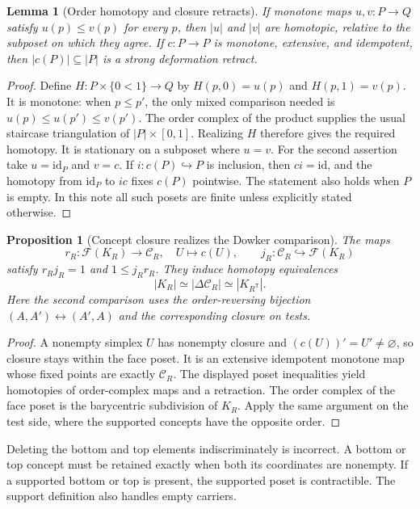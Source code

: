 \documentclass[11pt]{article}
\newtheorem{proposition}[theorem]{Proposition}
\newtheorem{lemma}[theorem]{Lemma}
\theoremstyle{remark}
\begin{document}
\begin{lemma}[Order homotopy and closure retracts]\label{cg:order-homotopy}
If monotone maps $u,v:P\to Q$ satisfy $u(p)\leq v(p)$ for every $p$, then
$|u|$ and $|v|$ are homotopic, relative to the subposet on which they agree.
If $c:P\to P$ is monotone, extensive, and idempotent, then
$|c(P)|\subseteq|P|$ is a strong deformation retract.
\end{lemma}
\begin{proof}
Define $H:P\times\{0<1\}\to Q$ by $H(p,0)=u(p)$ and $H(p,1)=v(p)$.
It is monotone: when $p\leq p'$, the only mixed comparison needed is
$u(p)\leq u(p')\leq v(p')$.
The order complex of the product supplies the usual staircase triangulation
of $|P|\times[0,1]$. Realizing $H$ therefore gives the required homotopy.
It is stationary on a subposet where $u=v$. For the second assertion take
$u=\mathrm{id}_P$ and $v=c$. If $i:c(P)\hookrightarrow P$ is inclusion,
then $c i=\mathrm{id}$, and the homotopy from $\mathrm{id}_P$ to $i c$
fixes $c(P)$ pointwise. The statement also holds when $P$ is empty. In this note all such posets are finite unless explicitly stated otherwise.
\end{proof}

\begin{proposition}[Concept closure realizes the Dowker comparison]
\label{nb:dowker-core}
The maps
\[
 r_R:\mathcal F(K_R)\longrightarrow\mathcal C_R,
 \quad U\longmapsto c(U),
 \qquad j_R:\mathcal C_R\hookrightarrow\mathcal F(K_R)
\]
satisfy $r_Rj_R=1$ and $1\leq j_Rr_R$. They induce homotopy
equivalences
\[
 |K_R|\simeq|\Delta\mathcal C_R|\simeq|K_{R^{\mathsf T}}|.
\]
Here the second comparison uses the order-reversing bijection
$(A,A')\leftrightarrow(A',A)$ and the corresponding closure on tests.
\end{proposition}
\begin{proof}
A nonempty simplex $U$ has nonempty closure and
$(c(U))'=U'\ne\varnothing$, so closure stays within the face poset.
It is an extensive idempotent monotone map whose fixed points are exactly
$\mathcal C_R$. The displayed poset inequalities yield homotopies of
order-complex maps and a retraction. The order complex of the face poset
is the barycentric subdivision of $K_R$. Apply the same argument on the
test side, where the supported concepts have the opposite order.
\end{proof}

Deleting the bottom and top elements indiscriminately is incorrect.
A bottom or top concept must be retained exactly when both its coordinates
are nonempty. If a supported bottom or top is present, the supported
poset is contractible. The support definition also handles empty carriers.
\end{document}
